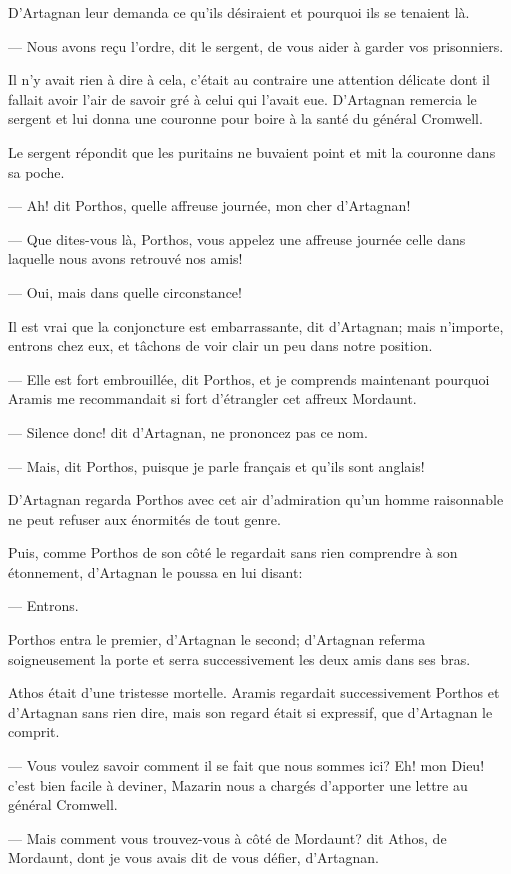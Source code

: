 D'Artagnan leur demanda ce qu'ils désiraient et pourquoi ils se tenaient là.

— Nous avons reçu l'ordre, dit le sergent, de vous aider à garder vos prisonniers.

Il n'y avait rien à dire à cela, c'était au contraire une attention délicate dont il fallait avoir l'air de savoir gré à celui qui l'avait eue. D'Artagnan remercia le sergent et lui donna une couronne pour boire à la santé du général Cromwell.

Le sergent répondit que les puritains ne buvaient point et mit la couronne dans sa poche.

— Ah! dit Porthos, quelle affreuse journée, mon cher d'Artagnan!

— Que dites-vous là, Porthos, vous appelez une affreuse journée celle dans laquelle nous avons retrouvé nos amis!

— Oui, mais dans quelle circonstance!

Il est vrai que la conjoncture est embarrassante, dit d'Artagnan; mais n'importe, entrons chez eux, et tâchons de voir clair un peu dans notre position.

— Elle est fort embrouillée, dit Porthos, et je comprends maintenant pourquoi Aramis me recommandait si fort d'étrangler cet affreux Mordaunt.

— Silence donc! dit d'Artagnan, ne prononcez pas ce nom.

— Mais, dit Porthos, puisque je parle français et qu'ils sont anglais!

D'Artagnan regarda Porthos avec cet air d'admiration qu'un homme raisonnable ne peut refuser aux énormités de tout genre.

Puis, comme Porthos de son côté le regardait sans rien comprendre à son étonnement, d'Artagnan le poussa en lui disant:

— Entrons.

Porthos entra le premier, d'Artagnan le second; d'Artagnan referma soigneusement la porte et serra successivement les deux amis dans ses bras.

Athos était d'une tristesse mortelle. Aramis regardait successivement Porthos et d'Artagnan sans rien dire, mais son regard était si expressif, que d'Artagnan le comprit.

— Vous voulez savoir comment il se fait que nous sommes ici? Eh! mon Dieu! c'est bien facile à deviner, Mazarin nous a chargés d'apporter une lettre au général Cromwell.

— Mais comment vous trouvez-vous à côté de Mordaunt? dit Athos, de Mordaunt, dont je vous avais dit de vous défier, d'Artagnan.

